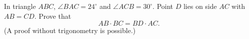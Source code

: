 In triangle $ABC$, $\angle BAC=24^\circ$ and $\angle ACB=30^\circ$. Point $D$ lies on side $AC$ with $AB=CD$. Prove that
\[AB\cdot BC=BD\cdot AC .\]
(A proof without trigonometry is possible.)
